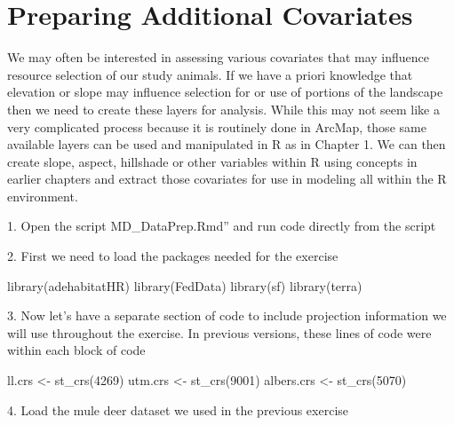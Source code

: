 \documentclass[
  letterpaper,
]{book}
\newenvironment{Shaded}{\begin{snugshade}}{\end{snugshade}}
\newcommand{\DecValTok}[1]{\textcolor[rgb]{0.68,0.00,0.00}{#1}}
\newcommand{\FunctionTok}[1]{\textcolor[rgb]{0.28,0.35,0.67}{#1}}
\newcommand{\NormalTok}[1]{\textcolor[rgb]{0.00,0.23,0.31}{#1}}
\newcommand{\OtherTok}[1]{\textcolor[rgb]{0.00,0.23,0.31}{#1}}
\begin{document}
\hypertarget{preparing-additional-covariates}{%
\chapter{Preparing Additional
Covariates}\label{preparing-additional-covariates}}

We may often be interested in assessing various covariates that may
influence resource selection of our study animals. If we have a priori
knowledge that elevation or slope may influence selection for or use of
portions of the landscape then we need to create these layers for
analysis. While this may not seem like a very complicated process
because it is routinely done in ArcMap, those same available layers can
be used and manipulated in R as in Chapter 1. We can then create slope,
aspect, hillshade or other variables within R using concepts in earlier
chapters and extract those covariates for use in modeling all within the
R environment.

1. Open the script MD\_DataPrep.Rmd'' and run code directly from the
script

2. First we need to load the packages needed for the exercise

\begin{Shaded}
\begin{Highlighting}[]
\FunctionTok{library}\NormalTok{(adehabitatHR)}
\FunctionTok{library}\NormalTok{(FedData)}
\FunctionTok{library}\NormalTok{(sf)}
\FunctionTok{library}\NormalTok{(terra)}
\end{Highlighting}
\end{Shaded}

3. Now let's have a separate section of code to include projection
information we will use throughout the exercise. In previous versions,
these lines of code were within each block of code

\begin{Shaded}
\begin{Highlighting}[]
\NormalTok{ll.crs }\OtherTok{\textless{}{-}} \FunctionTok{st\_crs}\NormalTok{(}\DecValTok{4269}\NormalTok{)}
\NormalTok{utm.crs }\OtherTok{\textless{}{-}} \FunctionTok{st\_crs}\NormalTok{(}\DecValTok{9001}\NormalTok{)}
\NormalTok{albers.crs }\OtherTok{\textless{}{-}} \FunctionTok{st\_crs}\NormalTok{(}\DecValTok{5070}\NormalTok{)}
\end{Highlighting}
\end{Shaded}

4. Load the mule deer dataset we used in the previous exercise
\end{document}
